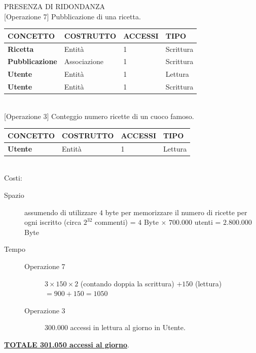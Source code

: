 \documentclass[12pt]{extarticle}
\begin{document}
\vspace{1cm}

\begin{center}
    \large{PRESENZA DI RIDONDANZA}\\
    \vspace{0.5cm}
    \normalsize{[Operazione 7] Pubblicazione di una ricetta.}\\
    \vspace{0.5cm}
    \begin{tabularx}{\textwidth}{X|X|X|X}
        \bfseries CONCETTO    & \bfseries COSTRUTTO     & \bfseries ACCESSI & \bfseries TIPO\\ 
        \hline\hline
        \bfseries Ricetta           & Entità         & 1       &   Scrittura    \\ 
        \hline
        \bfseries Pubblicazione     & Associazione   & 1       &   Scrittura    \\ 
        \hline
        \bfseries Utente            & Entità         & 1       &   Lettura    \\ 
        \hline
        \bfseries Utente            & Entità         & 1       &   Scrittura    \\ 
        \hline
    \end{tabularx}
    \\
    \vspace{1cm}
    \normalsize{[Operazione 3] Conteggio numero ricette di un cuoco famoso.}\\
    \vspace{0.5cm}
    \begin{tabularx}{\textwidth}{X|X|X|X}
        \bfseries CONCETTO    & \bfseries COSTRUTTO     & \bfseries ACCESSI & \bfseries TIPO\\ 
        \hline\hline
        \bfseries Utente            & Entità         & 1       &   Lettura    \\ 
        \hline
    \end{tabularx}
        \\
        \vspace{0.5cm} 
        Costi:
\end{center}

\begin{description}
    \item[Spazio] assumendo di utilizzare $4$ byte per memorizzare il numero di ricette per
    ogni iscritto (circa $2^{32}$ commenti) = $4$ Byte $\times$ $700.000$ utenti = $2.800.000$ Byte
    \item[Tempo] \hfill
    \begin{description}
        \item [Operazione 7] $3 \times 150 \times 2$ (contando doppia la scrittura) $+ 150$ (lettura) $= 900 + 150 = 1050$
        \item [Operazione 3] 300.000 accessi in lettura al giorno in Utente.
    \end{description}  
\end{description}
\begin{center}
\uline{\bfseries{TOTALE 301.050 accessi al giorno}}.
\end{center}
\end{document}

